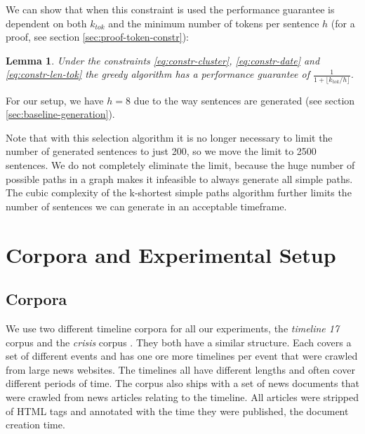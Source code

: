 \documentclass[a4paper,BCOR=10mm]{report}
\newtheorem{lemma}{Lemma}
\numberwithin{lemma}{chapter}
\numberwithin{definition}{chapter}
\begin{document}
We can show that when this constraint is used the performance guarantee is dependent on both $k_{tok}$ and the minimum number of tokens per sentence $h$ (for a proof, see section \ref{sec:proof-token-constr}):
\begin{lemma}
Under the constraints \ref{eq:constr-cluster}, \ref{eq:constr-date} and \ref{eq:constr-len-tok} the greedy algorithm has a performance guarantee of $\frac{1}{1 + \lfloor k_{\mathit{tok}} / h \rfloor}$.
\end{lemma}

For our setup, we have $h = 8$ due to the way sentences are generated (see section \ref{sec:baseline-generation}).





Note that with this selection algorithm it is no longer necessary to limit the number of generated sentences to just 200, so we move the limit to 2500 sentences.
We do not completely eliminate the limit, because the huge number of possible paths in a graph makes it infeasible to always generate all simple paths. The cubic complexity of the k-shortest simple paths algorithm further limits the number of sentences we can generate in an acceptable timeframe.

\chapter{Corpora and Experimental Setup} \label{sec:setup}

\section{Corpora} \label{sec:setup-corpora}

We use two different timeline corpora for all our experiments, the \textit{timeline 17} corpus \citep{tran-tl17} and the \textit{crisis} corpus \citep{tran-headlines}. They both have a similar structure. Each covers a set of different events and has one ore more timelines per event that were crawled from large news websites. The timelines all have different lengths and often cover different periods of time. The corpus also ships with a set of news documents that were crawled from news articles relating to the timeline. All articles were stripped of HTML tags and annotated with the time they were published, the document creation time.
\end{document}
